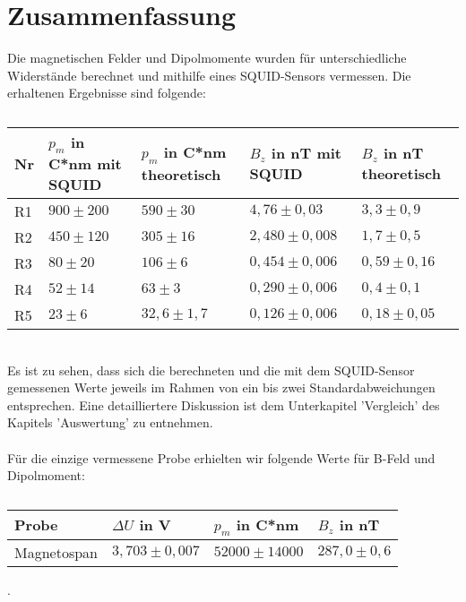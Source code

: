 \section{Zusammenfassung}
Die magnetischen Felder und Dipolmomente wurden für unterschiedliche Widerstände berechnet und mithilfe eines SQUID-Sensors vermessen. Die erhaltenen Ergebnisse sind folgende:
\begin{table}[htbp]
\caption{}
\begin{center}
\begin{tabular}{|l|p{3.5cm}|p{3.5cm}|p{3.5cm}|p{3.5cm}|}
\hline
Nr & $p_{m}$ in C*nm mit SQUID & $p_{m}$ in C*nm theoretisch & $B_{z}$ in nT mit SQUID & $B_{z}$ in nT theoretisch \\ \hline
R1 & $900\pm200$ & $590\pm30$ & $4,76\pm0,03$ & $3,3\pm0,9$ \\ 
R2 & $450\pm120$ & $305\pm16$ & $2,480\pm0,008$ & $1,7\pm0,5$ \\ 
R3 & $80\pm20$ & $106\pm6$ & $0,454\pm0,006$ & $0,59\pm0,16$ \\ 
R4 & $52\pm14$ & $63\pm3$ & $0,290\pm0,006$ & $0,4\pm0,1$ \\ 
R5 & $23\pm6$ & $32,6\pm1,7$ & $0,126\pm0,006$ & $0,18\pm0,05$ \\ \hline
\end{tabular}
\end{center}
\label{}
\end{table}
~\\
Es ist zu sehen, dass sich die berechneten und die mit dem SQUID-Sensor gemessenen Werte jeweils im Rahmen von ein bis zwei Standardabweichungen entsprechen. Eine detailliertere Diskussion ist dem Unterkapitel 'Vergleich' des Kapitels 'Auswertung' zu entnehmen. \\
~\\
Für die einzige vermessene Probe erhielten wir folgende Werte für B-Feld und Dipolmoment:
\begin{table}[htbp]
\caption{}
\begin{center}
\begin{tabular}{|l|l|l|l|}
\hline
Probe & $\Delta U$ in V & $p_{m}$ in C*nm & $B_{z}$ in nT \\ \hline
Magnetospan & $3,703\pm0,007$ & $52000\pm14000$ & $287,0\pm0,6$ \\ \hline
\end{tabular}
\end{center}
\label{}
\end{table}.